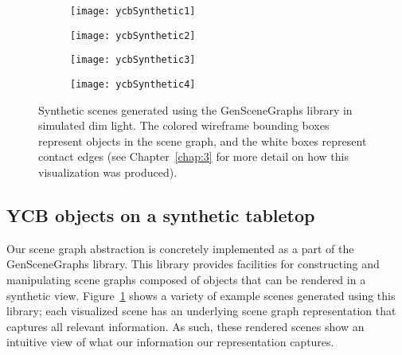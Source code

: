 \begin{figure}[H]
  \centering
  \begin{subfigure}[b]{0.45\textwidth}
    \centering
    \texttt{[image: ycbSynthetic1]}
  \end{subfigure}%
  \begin{subfigure}[b]{0.45\textwidth}
    \centering
    \texttt{[image: ycbSynthetic2]}
  \end{subfigure}
  \begin{subfigure}[b]{0.45\textwidth}
    \centering
    \texttt{[image: ycbSynthetic3]}
  \end{subfigure}%
  \begin{subfigure}[b]{0.45\textwidth}
    \centering
    \texttt{[image: ycbSynthetic4]}
  \end{subfigure}
  \caption{
    Synthetic scenes generated using the GenSceneGraphs library in simulated dim light.
    The colored wireframe bounding boxes represent objects in the scene graph, and the white boxes represent contact edges (see Chapter~\ref{chap:3} for more detail on how this visualization was produced).
  }
  \label{fig:syntheticYCBScene}
\end{figure}
\subsection{YCB objects on a synthetic tabletop}
Our scene graph abstraction is concretely implemented as a part of the GenSceneGraphs library.
This library provides facilities for constructing and manipulating scene graphs composed of objects that can be rendered in a synthetic view.
Figure~\ref{fig:syntheticYCBScene} shows a variety of example scenes generated using this library; each visualized scene has an underlying scene graph representation that captures all relevant information.
As such, these rendered scenes show an intuitive view of what our information our representation captures. \\

